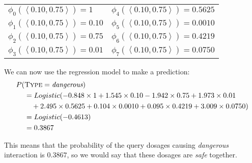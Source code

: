 \documentclass[solution]{ditpaper}
\begin{document}
\begin{enumerate}
\begin{answer}
			\begin{center}
\begin{tabular}[ht]{ l  l  }
$\phi_0(\left<0.10, 0.75\right>) =  1$ & $\phi_4(\left<0.10, 0.75\right>) = 0.5625$ \\
$\phi_1(\left<0.10, 0.75\right>) = 0.10$ & $\phi_5(\left<0.10, 0.75\right>) = 0.0010$ \\
$\phi_2(\left<0.10, 0.75\right>) = 0.75$ &$\phi_6(\left<0.10, 0.75\right>) = 0.4219$  \\
$\phi_3(\left<0.10, 0.75\right>) = 0.01$ & $\phi_7(\left<0.10, 0.75\right>) = 0.0750$ \\
\end{tabular}
\end{center}
	We can now use the regression model to make a prediction:
		\begin{alignat*}{2}				
P(&\textsc{Type}=\textit{dangerous}) \\
&= Logistic(-0.848\times 1 + 1.545 \times 0.10  -1.942 \times0.75 + 1.973 \times 0.01 \\
& ~~~   +  2.495   \times 0.5625 + 0.104 \times 0.0010 + 0.095 \times 0.4219 + 3.009\times 0.0750) \\
& =  Logistic(-0.4613)  \\
& = 0.3867 
\end{alignat*}
 
\noindent This means that the probability of the query dosages causing \textit{dangerous} interaction is $0.3867$, so we would say that these dosages are \textit{safe} together. 
%
% 


\end{answer}
\end{enumerate}
\end{document}
